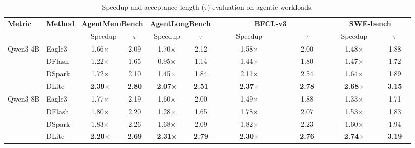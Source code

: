 \begin{table}[!h]
\centering
\vspace{-10pt}
\caption{Speedup and acceptance length ($\tau$) evaluation on agentic workloads.}
\label{tab:agent_benchmarks}
\small
\renewcommand{\arraystretch}{1.1}
\setlength{\tabcolsep}{4pt}
\begin{tabular}{l l cc cc cc cc}
\toprule
\multirow{2}{*}{\textbf{Metric}}
& \multirow{2}{*}{\textbf{Method}}
& \multicolumn{2}{c}{\textbf{AgentMemBench}}
& \multicolumn{2}{c}{\textbf{AgentLongBench}}
& \multicolumn{2}{c}{\textbf{\ \ \ \ \ \ \ \ \ BFCL-v3 \ \ \ \ \ \ \ \ \ }}
& \multicolumn{2}{c}{\textbf{\ \ \ \ SWE-bench\ \ \ \ }} \\
\cmidrule(lr){3-4}
\cmidrule(lr){5-6}
\cmidrule(lr){7-8}
\cmidrule(lr){9-10}
& & \ \ Speedup & $\tau$
& Speedup & $\tau$
& Speedup & $\tau$
& Speedup & $\tau$ \\
\midrule

\multirow{4}{*}{Qwen3-4B} 
& Eagle3      & 1.66$\times$   & 2.09   & 1.70$\times$  & 2.12  & 1.58$\times$  & 2.00   & 1.48$\times$  & 1.88   \\
& DFlash     & 1.22$\times$  & 1.65 & 0.95$\times$ & 1.14 & 1.44$\times$ & 1.80 & 1.47$\times$ & 1.72 \\
& DSpark     & 1.72$\times$ & 2.10 & 1.45$\times$ & 1.84 & 2.11$\times$ & 2.54 & 1.64$\times$ & 1.89 \\
& DLite & \textbf{2.39$\times$} & \textbf{2.80} & \textbf{2.07$\times$} & \textbf{2.51} & \textbf{2.37$\times$} & \textbf{2.78} & \textbf{2.68$\times$} & \textbf{3.15} \\

\midrule

\multirow{4}{*}{Qwen3-8B}
& Eagle3      &1.77$\times$ & 2.19 & 1.60$\times$ & 2.00 & 1.49$\times$  & 1.88 & 1.33$\times$  & 1.71 \\
& DFlash     & 1.80$\times$  & 2.20 & 1.28$\times$ & 1.65 & 1.78$\times$  & 2.07 & 1.53$\times$  & 1.83 \\
& DSpark     & 1.83$\times$  & 2.26 & 1.68$\times$ & 2.09 & 1.82$\times$  & 2.23 & 1.60$\times$  & 1.94 \\
& DLite & \textbf{2.20$\times$} & \textbf{2.69} & \textbf{2.31$\times$} & \textbf{2.79} & \textbf{2.30$\times$} & \textbf{2.76} & \textbf{2.74$\times$} & \textbf{3.19} \\ 


\bottomrule
\end{tabular}
\end{table}


